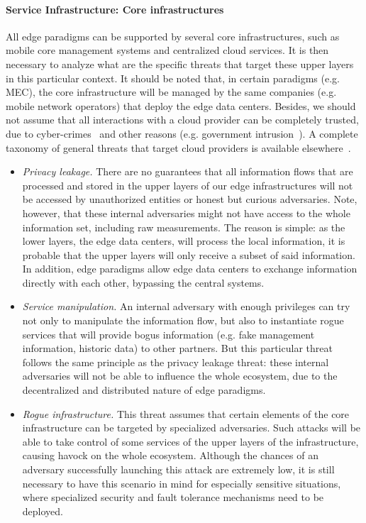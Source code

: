 \documentclass[twocolumn,preprint,3p]{elsarticle}
\begin{document}
\paragraph{Service Infrastructure: Core infrastructures} All edge paradigms can be supported by several core infrastructures, such as mobile core management systems and centralized cloud services. It is then necessary to analyze what are the specific threats that target these upper layers in this particular context. It should be noted that, in certain paradigms (e.g. MEC), the core infrastructure will be managed by the same companies (e.g. mobile network operators) that deploy the edge data centers. Besides, we should not assume that all interactions with a cloud provider can be completely trusted, due to cyber-crimes~\cite{Raymond10} and other reasons (e.g. government intrusion~\cite{Landau14}). A complete taxonomy of general threats that target cloud providers is available elsewhere~\cite{Viktoria15}.
    \begin{itemize}
      \item \textit{Privacy leakage.} There are no guarantees that all information flows that are processed and stored in the upper layers of our edge infrastructures will not be accessed by unauthorized entities or honest but curious adversaries. Note, however, that these internal adversaries might not have access to the whole information set, including raw measurements. The reason is simple: as the lower layers, the edge data centers, will process the local information, it is probable that the upper layers will only receive a subset of said information. In addition, edge paradigms allow edge data centers to exchange information directly with each other, bypassing the central systems.
      \item \textit{Service manipulation.} An internal adversary with enough privileges can try not only to manipulate the information flow, but also to instantiate rogue services that will provide bogus information (e.g. fake management information, historic data) to other partners. But this particular threat follows the same principle as the privacy leakage threat: these internal adversaries will not be able to influence the whole ecosystem, due to the decentralized and distributed nature of edge paradigms.
      \item \textit{Rogue infrastructure.} This threat assumes that certain elements of the core infrastructure can be targeted by specialized adversaries. Such attacks will be able to take control of some services of the upper layers of the infrastructure, causing havock on the whole ecosystem. Although the chances of an adversary successfully launching this attack are extremely low, it is still necessary to have this scenario in mind for especially sensitive situations, where specialized security and fault tolerance mechanisms need to be deployed.
    \end{itemize}
\end{document}
